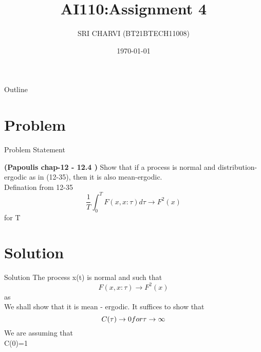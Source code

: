 \documentclass{beamer}
\title{AI110:Assignment 4 }
\author{SRI CHARVI (BT21BTECH11008)}
\date{\today}
\begin{document}
\begin{frame}
    \titlepage 
\end{frame}

\begin{frame}{Outline}
    \tableofcontents
\end{frame}


\section{Problem}
\begin{frame}{Problem Statement}

\textbf{(Papoulis chap-12 - 12.4 )}
Show that if a process is normal and distribution-ergodic as in (12-35), then it is also
mean-ergodic.\\
Defination from 12-35
\begin{equation*}
    \frac{1}{T}\int_{0}^{T}F(x,x:\tau)d\tau  \longrightarrow F^2(x)  
\end{equation*}
for T  \rightarrow \infty
\end{frame}


\section{Solution}
\begin{frame}{Solution}
The process x(t) is normal and such that
\begin{equation}
    F(x,x:\tau) \longrightarrow F^2(x) 
\end{equation}
as \tau \rightarrow \infty\\
We shall show that it is mean - ergodic. It suffices to show that
\begin{equation*}
    C(\tau) \rightarrow 0 \\ for \tau \rightarrow \infty
\end{equation*}
We are assuming that  \\  C(0)=1
\end{frame} 
\end{document}
